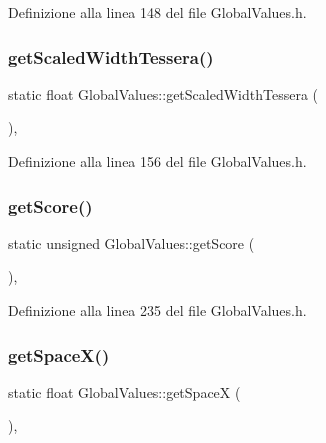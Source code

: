 Definizione alla linea 148 del file Global\+Values.\+h.

\mbox{\label{class_global_values_aff5d20cb6c6ffd44dd802f3807f4770e}} 
\subsubsection{\texorpdfstring{get\+Scaled\+Width\+Tessera()}{getScaledWidthTessera()}}
{\footnotesize\ttfamily static float Global\+Values\+::get\+Scaled\+Width\+Tessera (\begin{DoxyParamCaption}{ }\end{DoxyParamCaption})\hspace{0.3cm}{\ttfamily [inline]}, {\ttfamily [static]}}



Definizione alla linea 156 del file Global\+Values.\+h.

\mbox{\label{class_global_values_a9161bb57c2d284956356aee1d9d73970}} 
\subsubsection{\texorpdfstring{get\+Score()}{getScore()}}
{\footnotesize\ttfamily static unsigned Global\+Values\+::get\+Score (\begin{DoxyParamCaption}{ }\end{DoxyParamCaption})\hspace{0.3cm}{\ttfamily [inline]}, {\ttfamily [static]}}



Definizione alla linea 235 del file Global\+Values.\+h.

\mbox{\label{class_global_values_ac46053e4753d7eaf844623202f21fb3b}} 
\subsubsection{\texorpdfstring{get\+Space\+X()}{getSpaceX()}}
{\footnotesize\ttfamily static float Global\+Values\+::get\+SpaceX (\begin{DoxyParamCaption}{ }\end{DoxyParamCaption})\hspace{0.3cm}{\ttfamily [inline]}, {\ttfamily [static]}}



